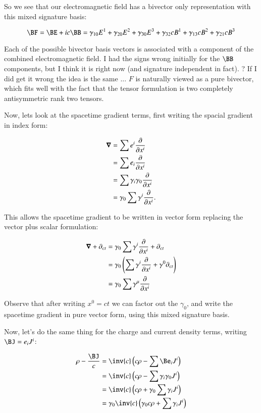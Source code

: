 So we see that our electromagnetic field has a bivector only representation with this mixed signature basis:

\begin{equation}
\BF = \BE + ic\BB = \gamma_{10} E^1 +\gamma_{20} E^2 +\gamma_{30} E^3 +\gamma_{32} c B^1 +\gamma_{13} c B^2 +\gamma_{21} c B^3 
\end{equation}

Each of the possible bivector basis vectors is associated with a component of the combined electromagnetic field.
I had the signs wrong initially for the $\BB$ components, but I think it is right now (and signature independent in fact).  ?  If I did get it wrong the idea is the same ... $F$ is naturally
viewed as a pure bivector, which fits well with the fact that the tensor formulation is two completely antisymmetric rank two tensors.

Now, lets look at the spacetime gradient terms, first writing the spacial gradient in index form:

\begin{align*}
\boldsymbol{\nabla} 
&= \sum e^i \frac{\partial}{\partial x^i} \\
&= \sum e_i \frac{\partial}{\partial x^i} \\
&= \sum \gamma_i \gamma_0 \frac{\partial}{\partial x^i} \\
&= \gamma_0 \sum \gamma^i \frac{\partial}{\partial x^i}.
\end{align*}

This allows the spacetime gradient to be written in vector form replacing the vector plus scalar formulation:

\begin{align*}
\boldsymbol{\nabla} + \partial_{ct}
&= \gamma_0 \sum \gamma^i \frac{\partial}{\partial x^i} + \partial_{ct} \\
&= \gamma_0 \left(\sum \gamma^i \frac{\partial}{\partial x^i} + \gamma^0 \partial_{ct} \right) \\
&= \gamma_0 \sum \gamma^{\mu} \frac{\partial}{\partial x^i} 
\end{align*}

Observe that after writing $x^0 = ct$ we can factor out the $\gamma_0$, and write the spacetime gradient in pure vector form, using this mixed signature basis.

Now, let's do the same thing for the charge and current density terms, writing $\BJ = e_i J^i$:

\begin{align*}
\rho - \frac{\BJ}{c}
&= \inv{c} \left( c\rho - \sum \Be_i J^i \right) \\
&= \inv{c} \left( c\rho - \sum \gamma_i \gamma_0 J^i \right) \\
&= \inv{c} \left( c\rho + \gamma_0 \sum \gamma_i J^i \right) \\
&= \gamma_0 \inv{c} \left( \gamma_0 c \rho + \sum \gamma_i J^i \right) \\
\end{align*}


